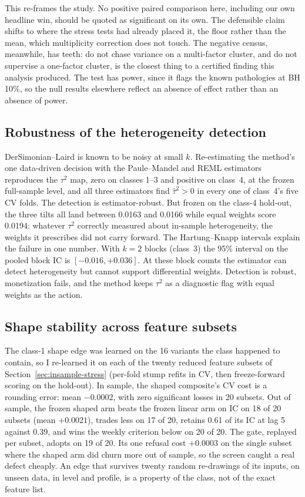 \documentclass[11pt]{article}
\begin{document}
This re-frames the study. No positive paired comparison here, including our own headline
win, should be quoted as significant on its own. The defensible claim shifts to where the
stress tests had already placed it, the floor rather than the mean, which multiplicity
correction does not touch. The negative census, meanwhile, has teeth: do not chase
variance on a multi-factor cluster, and do not supervise a one-factor cluster, is the
closest thing to a certified finding this analysis produced. The test has power, since it
flags the known pathologies at BH 10\%, so the null results elsewhere reflect an
absence of effect rather than an absence of power.

\subsection{Robustness of the heterogeneity detection}
\label{sec:referee-tau}

DerSimonian--Laird is known to be noisy at small $k$. Re-estimating the method's one
data-driven decision with the Paule--Mandel and REML estimators reproduces the $\tau^2$
map, zero on classes 1--3 and positive on class~4, at the frozen full-sample level, and
all three estimators find $\hat\tau^2>0$ in every one of class~4's five CV folds. The
detection is estimator-robust. But frozen on the class-4 hold-out, the three tilts all
land between 0.0163 and 0.0166 while equal weights score 0.0194: whatever $\tau^2$
correctly measured about in-sample heterogeneity, the weights it prescribes did not carry
forward. The Hartung--Knapp intervals explain the failure in one number. With $k=2$
blocks (class~3) the 95\% interval on the pooled block IC is $[-0.016, +0.036]$. At these
block counts the estimator can detect heterogeneity but cannot support differential
weights. Detection is robust, monetization fails, and the method keeps $\tau^2$ as a
diagnostic flag with equal weights as the action.

\subsection{Shape stability across feature subsets}
\label{sec:referee-shapes}

The class-1 shape edge was learned on the 16 variants the class happened to contain, so I
re-learned it on each of the twenty reduced feature subsets of
Section~\ref{sec:insample-stress} (per-fold stump refits in CV, then freeze-forward
scoring on the hold-out). In sample, the shaped composite's CV cost is a rounding error:
mean $-0.0002$, with zero significant losses in 20 subsets. Out of sample, the frozen
shaped arm beats the frozen linear arm on IC on 18 of 20 subsets (mean $+0.0021$), trades
less on 17 of 20, retains 0.61 of its IC at lag 5 against 0.39, and wins the weekly
criterion below on 20 of 20. The gate, replayed per subset, adopts on 19 of 20. Its one
refusal cost $+0.0003$ on the single subset where the shaped arm did churn more out of
sample, so the screen caught a real defect cheaply. An edge that survives twenty random
re-drawings of its inputs, on unseen data, in level and profile, is a property of the
class, not of the exact feature list.
\end{document}
